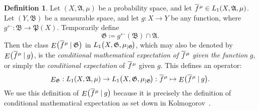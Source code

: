 \documentclass[
twoside=true,
paper=letter,
fontsize=11pt,
pagesize=auto,
leqno,
openany,
headsepline,
overfullrule,
]{scrbook}
\theoremstyle{plain}
\theoremstyle{plain}
\theoremstyle{definition}
\newtheorem{defn}[thm]{Definition}
\theoremstyle{bfnoteitalic}
\theoremstyle{bfnoteroman}
\newcommand{\sigalg}[1]{\mathfrak{#1}}
\newcommand{\definedby}{\coloneqq}
\newcommand{\given}{\mathbin{\vert}}
\newcommand{\kondexpgvn}[2]
{\mathop{E}\bigl(#1\given#2\bigr)}
\newcommand{\kondexpop}{\mathop{E}}
\newcommand{\restrictedto}[1]{_{\lvert#1}\kern-1.5pt}
\newcommand{\preimage}[1]{#1^{\leftarrow}}
\newcommand{\meets}{\cap}
\newcommand{\sigmaalgebra}{\sigalg{A}}
\newcommand{\sigmaalgebraii}{\sigalg{B}}
\newcommand{\powerset}{\mathfrak{P}}
\newcommand{\function}{f}
\newcommand{\functionii}{g}
\newcommand{\measurespace}{X}
\newcommand{\measurespaceii}{Y}
\newcommand{\measure}{\mu}
\newcommand*\xbar[1]{%
   \hbox{%
     \vbox{%
       \hrule height 0.4pt %
       \kern0.4ex%
       \hbox{%
         \ensuremath{#1}%
       }%
     }%
   }%
}
\newcommand{\lebclass}[1]{\hspace{.5pt}\xbar{#1}\hspace{0.5pt}}
\newcommand{\ellclass}[2]{\lebclass{#1}^{#2}}
\begin{document}
\begin{defn}\label{cme_function}
Let $(\measurespace, \sigmaalgebra,\measure)$ be a probability space, and let
$\ellclass{\function}{\measure}\in L_1(\measurespace, \sigmaalgebra,\measure)$.
Let $(\measurespaceii, \sigmaalgebraii)$ be a measurable space, and let $\functionii:\measurespace\to\measurespaceii$ be any function, where $\preimage{\functionii}:\sigmaalgebraii\to\powerset(\measurespace)$.
Temporarily define
\[
\sigalg{G}\definedby
\preimage{\functionii}(\sigmaalgebraii)\meets\sigmaalgebra.
\]
Then the class 
$\kondexpgvn{\ellclass{\function}{\measure}}{\sigalg{G}}$
in
$L_1\bigl(\measurespace, \sigalg{G},\measure\restrictedto{\sigalg{G}}\bigr)$, 
which may also be denoted by
$\kondexpgvn{\ellclass{\function}{\measure}}{\functionii}$, is the \emph{conditional mathematical expectation of} $\ellclass{\function}{\measure}$ \emph{given the function} $\functionii$, or simply the \emph{conditional expectation} of $\ellclass{\function}{\measure}$ given $\functionii$. This defines an operator:
\[
\kondexpop\nolimits_{\sigalg{G}}
:
L_1(\measurespace, \sigmaalgebra,\measure) \to
L_1\bigl(\measurespace, 
\sigalg{G},
\measure\restrictedto{\sigalg{G}}
\bigr):
\ellclass{\function}{\measure}\mapsto \kondexpgvn{\ellclass{\function}{\measure}}{\functionii}.
\]
We use this definition of $\kondexpgvn{\ellclass{\function}{\measure}}{\functionii}$ because it is precisely the definition of conditional mathematical expectation as set down in Kolmogorov~\cite{fottop_kolmogorov_1956}. 


\end{defn}
\end{document}
